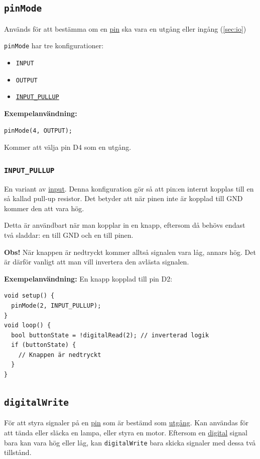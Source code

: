\documentclass[11pt]{article}
\begin{document}
\subsection{\texttt{pinMode}}\label{sec:pinmode}
Används för att bestämma om en \hyperref[sec:pin]{pin} ska vara en utgång eller
ingång (\ref{sec:io})

\texttt{pinMode} har tre konfigurationer:
\begin{itemize}
  \item \texttt{INPUT}
  \item \texttt{OUTPUT}
  \item \hyperref[sec:input_pullup]{\texttt{INPUT\_PULLUP}}
\end{itemize}

\textbf{Exempelanvändning:}
\begin{lstlisting}
pinMode(4, OUTPUT);
\end{lstlisting}
Kommer att välja pin D4 som en utgång.

\subsubsection{\texttt{INPUT\_PULLUP}}\label{sec:input_pullup}
En variant av \hyperref[sec:input]{input}. Denna konfiguration gör så att
pin:en internt kopplas till en så kallad pull-up resistor.
Det betyder att när pinen inte är kopplad till GND kommer den att vara hög.

Detta är användbart när man kopplar in en knapp, eftersom då behövs endast två
sladdar: en till GND och en till pinen.

\textbf{Obs!} När knappen är nedtryckt kommer alltså signalen vara låg, annars
hög. Det är därför vanligt att man vill invertera den avlästa signalen.

\textbf{Exempelanvändning:}
En knapp kopplad till pin D2:
\begin{lstlisting}
void setup() {
  pinMode(2, INPUT_PULLUP);
}
void loop() {
  bool buttonState = !digitalRead(2); // inverterad logik
  if (buttonState) {
    // Knappen är nedtryckt
  }
}
\end{lstlisting}

\subsection{\texttt{digitalWrite}}
För att styra signaler på en \hyperref[sec:pin]{pin} som är bestämd som
\hyperref[sec:io]{utgång}. Kan användas för att tända eller släcka en lampa,
eller styra en motor. Eftersom en \hyperref[sec:analog-digital]{digital} signal
bara kan vara hög eller låg, kan \texttt{digitalWrite} bara skicka signaler med
dessa två tillstånd.
\end{document}
